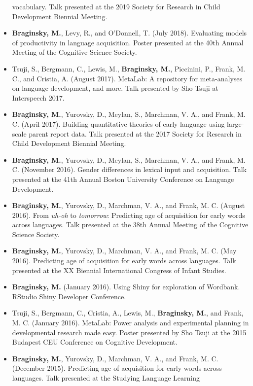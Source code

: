 \documentclass[11pt,]{article}
\begin{document}
\begin{itemize}
  vocabulary. Talk presented at the 2019 Society for Research in Child
  Development Biennial Meeting.
\item
  \textbf{Braginsky, M.}, Levy, R., and O'Donnell, T. (July 2018).
  Evaluating models of productivity in language acquisition. Poster
  presented at the 40th Annual Meeting of the Cognitive Science Society.
\item
  Tsuji, S., Bergmann, C., Lewis, M., \textbf{Braginsky, M.}, Piccinini,
  P., Frank, M. C., and Cristia, A. (August 2017). MetaLab: A repository
  for meta-analyses on language development, and more. Talk presented by
  Sho Tsuji at Interspeech 2017.
\item
  \textbf{Braginsky, M.}, Yurovsky, D., Meylan, S., Marchman, V. A., and
  Frank, M. C. (April 2017). Building quantitative theories of early
  language using large-scale parent report data. Talk presented at the
  2017 Society for Research in Child Development Biennial Meeting.
\item
  \textbf{Braginsky, M.}, Yurovsky, D., Meylan, S., Marchman, V. A., and
  Frank, M. C. (November 2016). Gender differences in lexical input and
  acquisition. Talk presented at the 41th Annual Boston University
  Conference on Language Development.
\item
  \textbf{Braginsky, M.}, Yurovsky, D., Marchman, V. A., and Frank, M.
  C. (August 2016). From \emph{uh-oh} to \emph{tomorrow}: Predicting age
  of acquisition for early words across languages. Talk presented at the
  38th Annual Meeting of the Cognitive Science Society.
\item
  \textbf{Braginsky, M.}, Yurovsky, D., Marchman, V. A., and Frank, M.
  C. (May 2016). Predicting age of acquisition for early words across
  languages. Talk presented at the XX Biennial International Congress of
  Infant Studies.
\item
  \textbf{Braginsky, M.} (January 2016). Using Shiny for exploration of
  Wordbank. RStudio Shiny Developer Conference.
\item
  Tsuji, S., Bergmann, C., Cristia, A., Lewis, M., \textbf{Braginsky,
  M.}, and Frank, M. C. (January 2016). MetaLab: Power analysis and
  experimental planning in developmental research made easy. Poster
  presented by Sho Tsuji at the 2015 Budapest CEU Conference on
  Cognitive Development.
\item
  \textbf{Braginsky, M.}, Yurovsky, D., Marchman, V. A., and Frank, M.
  C. (December 2015). Predicting age of acquisition for early words
  across languages. Talk presented at the Studying Language Learning

\end{itemize}
\end{document}

